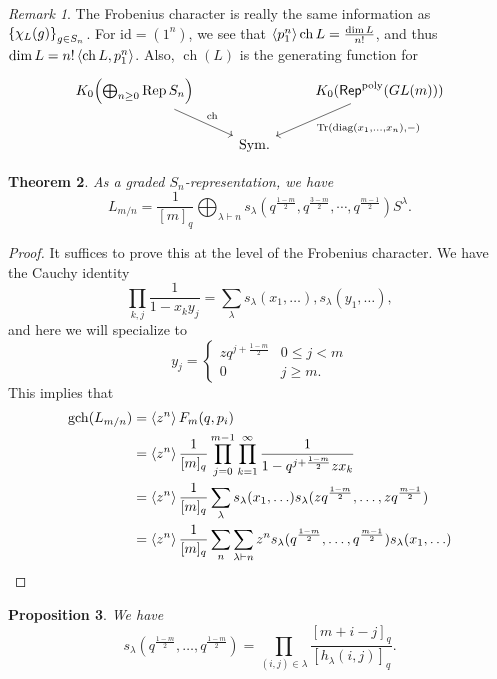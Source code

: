 \documentclass[leqno, openany]{memoir}
\newtheorem{thm}{Theorem}[section]
\newtheorem{prop}[thm]{Proposition}
\theoremstyle{definition}
\theoremstyle{remark}
\newtheorem{rmk}[thm]{Remark}
\theoremstyle{plain}
\theoremstyle{definition}
\theoremstyle{remark}
\newcommand{\mr}[1]{\mathrm{#1}}
\newcommand{\ms}[1]{\mathsf{#1}}
\newcommand{\on}[1]{\operatorname{#1}}
\newcommand{\1}{\mathbf{1}}
\newcommand{\2}{\mathbf{2}}
\newcommand{\3}{\mathbf{3}}
\DeclareMathOperator{\ch}{ch}
\begin{document}
\begin{rmk}
    The Frobenius character is really the same information as $\qty{\chi_L(g)}_{g \in S_n}$. For $\mr{id} = (1^n)$, we see that $\ev{p_1^n} \on{ch} L = \frac{\dim L}{n!}$, and thus $\dim L = n! \ev{\on{ch} L, p_1^n}$. Also, $\on{\ch}(L)$ is the generating function for
    \begin{equation*}
    \begin{tikzcd}
        K_0\qty(\bigoplus_{n \geq 0} \on{Rep} S_n) \ar{dr}{\on{ch}} & & K_0(\ms{Rep}^{\mr{poly}}(GL(m))) \ar{dl}{\Tr(\mr{diag}(x_1, \ldots, x_n), -)} \\
        & \mr{Sym}.
    \end{tikzcd}
    \end{equation*}
\end{rmk}

\begin{thm}
    As a graded $S_n$-representation, we have
    \[ L_{m/n} = \frac{1}{[m]_q} \bigoplus_{\lambda \vdash n} s_{\lambda}(q^{\frac{1-m}{2}}, q^{\frac{3-m}{2}}, \cdots, q^{\frac{m-1}{2}}) S^{\lambda}. \]
\end{thm}

\begin{proof}
    It suffices to prove this at the level of the Frobenius character. We have the Cauchy identity
    \[ \prod_{k, j} \frac{1}{1-x_k y_j} = \sum_{\lambda} s_{\lambda}(x_1, \ldots), s_{\lambda}(y_1, \ldots), \]
    and here we will specialize to
    \[ y_j = \begin{cases}
        z q^{j + \frac{1-m}{2}} & 0 \leq j < m \\
        0 & j \geq m.
    \end{cases}
    \]
    This implies that
    \begin{align*}
        \mr{gch}(L_{m/n}) &= \ev{z^n} F_m(q, p_i) \\
        &= \ev{z^n} \frac{1}{[m]_q} \prod_{j=0}^{m-1} \prod_{k=1}^{\infty} \frac{1}{1-q^{j+\frac{1-m}{2}} z x_k} \\
        &= \ev{z^n} \frac{1}{[m]_q} \sum_{\lambda} s_{\lambda}(x_1, \ldots) s_{\lambda}(zq^{\frac{1-m}{2}}, \ldots, zq^{\frac{m-1}{2}}) \\
        &= \ev{z^n} \frac{1}{[m]_q} \sum_n \sum_{\lambda \vdash n} z^n s_{\lambda}(q^{\frac{1-m}{2}}, \ldots, q^{\frac{m-1}{2}}) s_{\lambda}(x_1, \ldots) \qedhere
    \end{align*}
\end{proof}

\begin{prop}
    We have 
    \[ s_{\lambda}(q^{\frac{1-m}{2}}, \ldots, q^{\frac{1-m}{2}}) = \prod_{(i,j) \in \lambda} \frac{[m+i-j]_q}{[h_{\lambda}(i, j)]_q}. \]
\end{prop}
\end{document}
